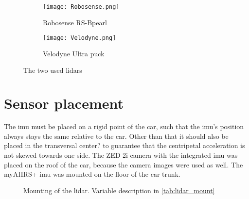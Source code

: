 \begin{figure}[htb]
	\centering
	\begin{subfigure}{0.3\textwidth}
		\centering
		\texttt{[image: Robosense.png]}
		\caption{Robosense RS-Bpearl \cite{RoboSense2020}}
		\label{fig:lidar_robosense}
	\end{subfigure}
	\begin{subfigure}{0.3\textwidth}
		\centering
		\texttt{[image: Velodyne.png]}
		\caption{Velodyne Ultra puck \cite{Velodyne2018}}
		\label{fig:lidar_velodyne}
	\end{subfigure}
	\caption{The two used \gls{lidar}s}
	\label{fig:lidars_used}
\end{figure}



\section{Sensor placement}
The \gls{imu} must be placed on a rigid point of the car, such that the \gls{imu}'s position always stays the same relative to the car.
Other than that it should also be placed in the transversal center? to guarantee that the centripetal acceleration is not skewed towards one side.
The ZED 2i camera with the integrated \gls{imu} was placed on the roof of the car, because the camera images were used as well.
The myAHRS+ \gls{imu} was mounted on the floor of the car trunk.\\
\begin{figure}[htpb]
	\centering
	
	\caption{Mounting of the \acrshort{lidar}. Variable description in \cref{tab:lidar_mount}}
	\label{fig:tikz_lidar_mount}
\end{figure}
